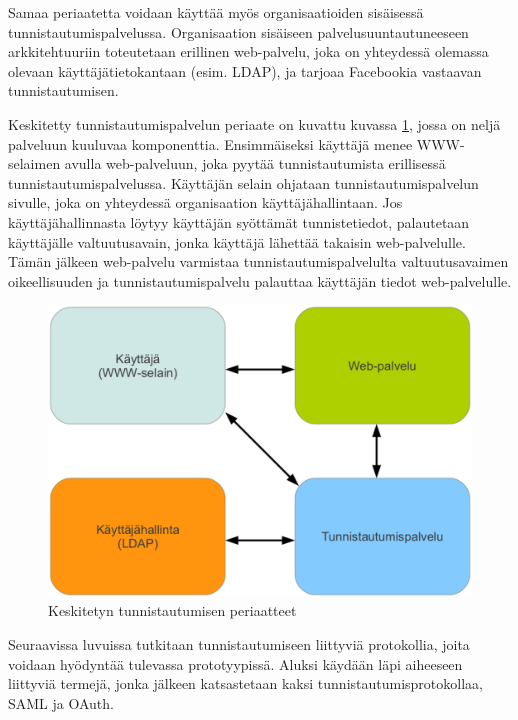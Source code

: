 Samaa periaatetta voidaan käyttää myös organisaatioiden sisäisessä tunnistautumispalvelussa. Organisaation sisäiseen palvelusuuntautuneeseen arkkitehtuuriin toteutetaan erillinen web-palvelu, joka on yhteydessä olemassa olevaan käyttäjätietokantaan (esim. LDAP), ja tarjoaa Facebookia vastaavan tunnistautumisen.

Keskitetty tunnistautumispalvelun periaate on kuvattu kuvassa \ref{composition}, jossa on neljä palveluun kuuluvaa komponenttia. Ensimmäiseksi käyttäjä menee WWW-selaimen avulla web-palveluun, joka pyytää tunnistautumista erillisessä tunnistautumispalvelussa. Käyttäjän selain ohjataan tunnistautumispalvelun sivulle, joka on yhteydessä organisaation käyttäjähallintaan. Jos käyttäjähallinnasta löytyy käyttäjän syöttämät tunnistetiedot, palautetaan käyttäjälle valtuutusavain, jonka käyttäjä lähettää takaisin web-palvelulle. Tämän jälkeen web-palvelu varmistaa tunnistautumispalvelulta valtuutusavaimen oikeellisuuden ja tunnistautumispalvelu palauttaa käyttäjän tiedot web-palvelulle.

\begin{figure}[ht]
\centering
\includegraphics[width=\textwidth]{teknologiat/composition.eps}
\caption{Keskitetyn tunnistautumisen periaatteet}%
\label{composition}
\end{figure}

Seuraavissa luvuissa tutkitaan tunnistautumiseen liittyviä protokollia, joita voidaan hyödyntää tulevassa prototyypissä. Aluksi käydään läpi aiheeseen liittyviä termejä, jonka jälkeen katsastetaan kaksi tunnistautumisprotokollaa, SAML ja OAuth.